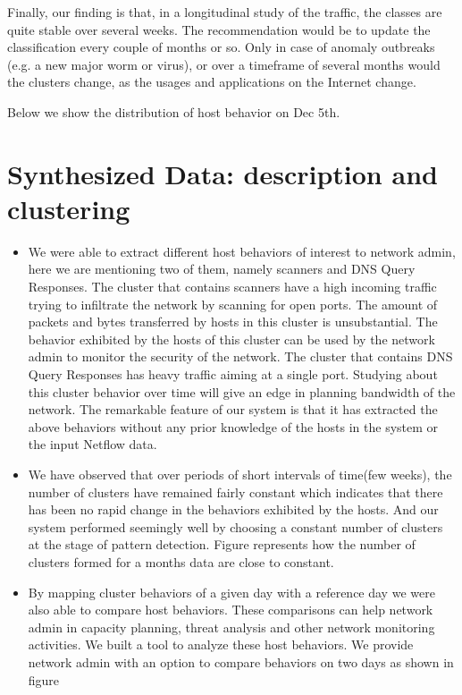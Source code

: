 Finally, our finding is that, in a
longitudinal study of the traffic, the classes are quite stable over several weeks. The recommendation
would be to update the classification every couple of months or so. Only in case of anomaly outbreaks
(e.g. a new major worm or virus), or over a timeframe of several months would the clusters change,
as the usages and applications on the Internet change.

Below we show the distribution of host behavior on Dec 5th.








\section{Synthesized Data: description and clustering}


\begin{itemize}
\item We were able to extract different host behaviors of interest to network admin, here we are mentioning two of them, namely scanners and DNS Query Responses. The cluster that contains scanners have a high incoming traffic trying to infiltrate the
network by scanning for open ports. The amount of packets and bytes transferred by hosts in this cluster is unsubstantial. The behavior exhibited by the hosts of this
cluster can be used by the network admin to monitor the security of the network.
The cluster that contains DNS Query Responses has heavy traffic aiming at a single
port. Studying about this cluster behavior over time will give an edge in planning
bandwidth of the network. The remarkable feature of our system is that it has extracted
the above behaviors without any prior knowledge of the hosts in the system or the input Netflow data.
\item We have observed that over periods of short intervals of time(few weeks), the number
of clusters have remained fairly constant which indicates that there has been no
rapid change in the behaviors exhibited by the hosts. And our system performed
seemingly well by choosing a constant number of clusters at the stage of pattern
detection. Figure  represents how the number of clusters formed for a months
data are close to constant.

\item  By mapping cluster behaviors of a given day with a reference day we were also able
to compare host behaviors. These comparisons can help network admin in capacity
planning, threat analysis and other network monitoring activities. We built a tool to analyze these host behaviors. 
We provide network admin with an option to compare
behaviors on two days as shown in figure 


\end{itemize}

